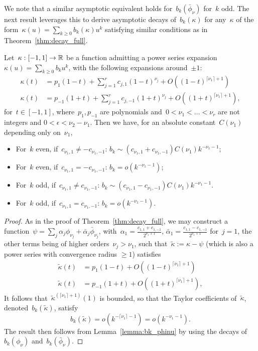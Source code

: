 We note that a similar asymptotic equivalent holds for~$b_k(\bar \phi_\nu)$ for~$k$ odd.
The next result leverages this to derive asymptotic decays of~$b_k(\kappa)$ for any~$\kappa$ of the form~$\kappa(u) = \sum_{k \geq 0} b_k(\kappa) u^k$ satisfying similar conditions as in Theorem~\ref{thm:decay_full}.

\begin{corollary}
Let~$\kappa: [-1,1] \to {\mathbb R}$ be a function admitting a power series expansion~$\kappa(u) = \sum_{k \geq 0} b_k u^k$, with the following expansions around~$\pm 1$:
\begin{align}
\kappa(t) &= p_1(1-t) + \sum_{j=1}^r c_{j,1} (1-t)^{\nu_j} + O((1-t)^{\lceil\nu_1\rceil + 1}) \\
\kappa(t) &= p_{-1}(1+t) + \sum_{j=1}^r c_{j,-1} (1+t)^{\nu_j} + O((1+t)^{\lceil\nu_1\rceil + 1}),
\end{align}
for~$t \in [-1, 1]$, where~$p_1, p_{-1}$ are polynomials and~$0 < \nu_1 < \ldots < \nu_r$ are not integers and $0 < \epsilon < \nu_2 - \nu_1$.
Then we have, for an absolute constant~$C(\nu_1)$ depending only on~$\nu_1$,
\begin{itemize}[noitemsep]
	\item For~$k$ even, if~$c_{\nu_1,1} \ne -c_{\nu_1,-1}$: $b_k \sim (c_{\nu_1,1} + c_{\nu_1,-1}) C(\nu_1) k^{- \nu_1 - 1}$;
	\item For~$k$ even, if~$c_{\nu_1,1} = -c_{\nu_1,-1}$: $b_k = o(k^{- \nu_1 - 1})$;
	\item For~$k$ odd, if~$c_{\nu_1,1} \ne c_{\nu_1,-1}$: $b_k \sim (c_{\nu_1,1} - c_{\nu_1,-1}) C(\nu_1) k^{- \nu_1 - 1}$.
	\item For~$k$ odd, if~$c_{\nu_1,1} = c_{\nu_1,-1}$: $b_k =o(k^{- \nu_1 - 1})$.
\end{itemize}
\end{corollary}

\begin{proof}
As in the proof of Theorem~\ref{thm:decay_full}, we may construct a function~$\psi = \sum_j \alpha_j \phi_{\nu_j} + \bar \alpha_j \bar \phi_{\nu_j}$, with~$\alpha_1 = \frac{c_{1,1} + c_{1,-1}}{2^{\nu_1 + 1}}$, $\bar \alpha_1 = \frac{c_{1,1} - c_{1,-1}}{2^{\nu_1 + 1}}$ for~$j=1$, the other terms being of higher orders~$\nu_j > \nu_1$, such that~$\tilde \kappa := \kappa - \psi$ (which is also a power series with convergence radius $\geq 1$) satisfies
\begin{align}
\tilde \kappa(t) &= p_1(1-t) + O((1-t)^{\lceil\nu_1\rceil + 1}) \\
\tilde \kappa(t) &= p_{-1}(1+t) + O((1+t)^{\lceil\nu_1\rceil + 1}),
\end{align}
It follows that~$\tilde \kappa^{(\lceil\nu_1\rceil + 1)}(1)$ is bounded, so that the Taylor coefficients of~$\tilde \kappa$, denoted~$b_k(\tilde \kappa)$, satisfy
\begin{equation*}
b_k(\tilde \kappa) = o(k^{- \lceil\nu_1\rceil - 1}) = o(k^{- \nu_1 - 1}).
\end{equation*}
The result then follows from Lemma~\ref{lemma:bk_phinu} by using the decays of~$b_k(\phi_\nu)$ and~$b_k(\bar \phi_\nu)$.

\end{proof}